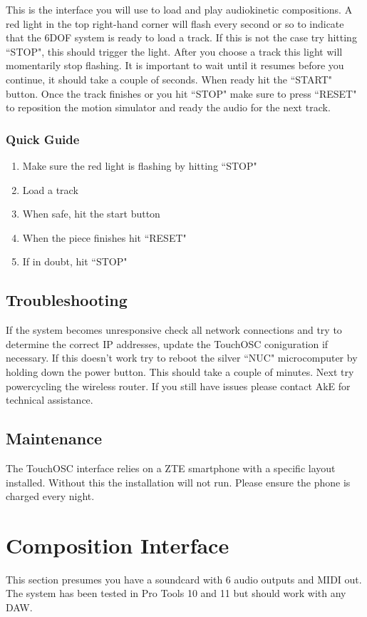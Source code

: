 \documentclass{article}
\begin{document}
	This is the interface you will use to load and play audiokinetic 
	compositions. A red light in the top right-hand corner will flash every 
	second or so to indicate that the 6DOF system is ready to load a track. If 
	this is not the case try hitting ``STOP", this should trigger the light.
	After you choose a track this light will momentarily stop flashing. It is 
	important to wait until it resumes before you continue, it should take a 
	couple of seconds. When ready hit the ``START" button. Once the track 
	finishes or you hit ``STOP" make sure to press ``RESET" to reposition the 
	motion simulator and ready the audio for the next track.

	\subsubsection{Quick Guide}
	\begin{enumerate}
		\item Make sure the red light is flashing by hitting ``STOP"
		\item Load a track
		\item When safe, hit the start button
		\item When the piece finishes hit ``RESET"
		\item If in doubt, hit ``STOP"
	\end{enumerate}

	\subsection{Troubleshooting}
	If the system becomes unresponsive check all network connections and try to 
	determine the correct IP addresses, update the TouchOSC coniguration if 
	necessary. If this doesn't work try to reboot the silver ``NUC" 
	microcomputer by holding down the power button. This should take 
	a couple of minutes. Next try powercycling the wireless router. If you 
	still have issues please contact AkE for technical assistance.

	\subsection{Maintenance}
	The TouchOSC interface relies on a ZTE smartphone with a specific layout 
	installed. Without this the installation will not run. Please ensure the 
	phone is charged every night.

	\section{Composition Interface}
	\label{comp}
	This section presumes you have a soundcard with 6 audio outputs and MIDI 
	out. The system has been tested in Pro Tools 10 and 11 but should work with
	any DAW.
\end{document}
